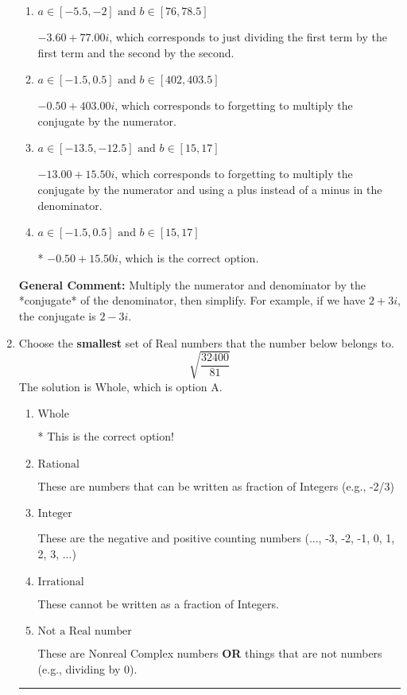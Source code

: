 \documentclass{extbook}[14pt]
\newcommand{\litem}[1]{\item #1

\rule{\textwidth}{0.4pt}}
\begin{document}
\begin{enumerate}
{\begin{enumerate}[label=\Alph*.]
 $-6.42  + 14.12 i$, which corresponds to forgetting to multiply the conjugate by the numerator and not computing the conjugate correctly.
\item \( a \in [-5.5, -2] \text{ and } b \in [76, 78.5] \)

 $-3.60  + 77.00 i$, which corresponds to just dividing the first term by the first term and the second by the second.
\item \( a \in [-1.5, 0.5] \text{ and } b \in [402, 403.5] \)

 $-0.50  + 403.00 i$, which corresponds to forgetting to multiply the conjugate by the numerator.
\item \( a \in [-13.5, -12.5] \text{ and } b \in [15, 17] \)

 $-13.00  + 15.50 i$, which corresponds to forgetting to multiply the conjugate by the numerator and using a plus instead of a minus in the denominator.
\item \( a \in [-1.5, 0.5] \text{ and } b \in [15, 17] \)

* $-0.50  + 15.50 i$, which is the correct option.
\end{enumerate}

\textbf{General Comment:} Multiply the numerator and denominator by the *conjugate* of the denominator, then simplify. For example, if we have $2+3i$, the conjugate is $2-3i$.
}
\litem{
Choose the \textbf{smallest} set of Real numbers that the number below belongs to.
\[ \sqrt{\frac{32400}{81}} \]The solution is \( \text{Whole} \), which is option A.\begin{enumerate}[label=\Alph*.]
\item \( \text{Whole} \)

* This is the correct option!
\item \( \text{Rational} \)

These are numbers that can be written as fraction of Integers (e.g., -2/3)
\item \( \text{Integer} \)

These are the negative and positive counting numbers (..., -3, -2, -1, 0, 1, 2, 3, ...)
\item \( \text{Irrational} \)

These cannot be written as a fraction of Integers.
\item \( \text{Not a Real number} \)

These are Nonreal Complex numbers \textbf{OR} things that are not numbers (e.g., dividing by 0).
\end{enumerate}

}
\end{enumerate}
\end{document}
